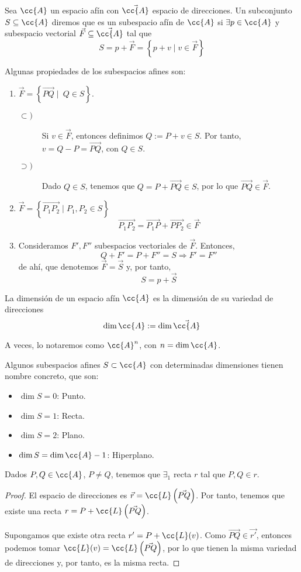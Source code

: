 \begin{definicion}
    Sea $\cc{A}$ un espacio afín con $\vec{\cc{A}}$ espacio de direcciones. Un subconjunto $S\subseteq \cc{A}$ diremos que es un subespacio afín de $\cc{A}$ si $\exists p\in \cc{A}$ y subespacio vectorial $\vec{F}\subseteq \vec{\cc{A}}$ tal que $$S=p+\vec{F}=\left\{p+v\mid v\in \vec{F}\right\}$$
\end{definicion}
Algunas propiedades de los subespacios afines son:
\begin{enumerate}
    \item $\vec{F}=\left\{\vec{PQ}\mid ~Q\in S\right\}$.
    \begin{description}
        \item[$\subset)$] Si $v\in \vec{F}$, entonces definimos $Q:=P+v\in S$. Por tanto, $v=Q-P=\vec{PQ}$, con $Q\in S$.

        \item[$\supset)$] Dado $Q\in S$, tenemos que $Q=P+\vec{PQ}\in S$, por lo que $\vec{PQ}\in \vec{F}$.
    \end{description}
    \item $\vec{F}=\left\{\vec{P_1P_2}\mid P_1,P_2\in S\right\}$
    $$\vec{P_1P_2} = \vec{P_1P} + \vec{PP_2}\in \vec{F}$$
    \item Consideramos $F', F''$ subespacios vectoriales de $\vec{F}$. Entonces,
    $$Q+F' = P+F'' = S \Longrightarrow F'=F''$$
    de ahí, que denotemos $\vec{F}=\vec{S}$ y, por tanto,
    $$S=p+\vec{S}$$
\end{enumerate}


\begin{definicion}
    La dimensión de un espacio afín $\cc{A}$ es la dimensión de su variedad de direcciones
    $$\dim \cc{A} :=\dim \vec{\cc{A}}$$
    
    A veces, lo notaremos como $\cc{A}^n$, con $n=\dim \cc{A}$.
\end{definicion}

Algunos subespacios afines $S\subset \cc{A}$ con determinadas dimensiones tienen nombre concreto, que son:
\begin{itemize}
    \item $\dim S=0$: Punto.
    \item $\dim S=1$: Recta.
    \item $\dim S=2$: Plano.
    \item $\dim S=\dim \cc{A}-1$: Hiperplano.
\end{itemize}

\begin{prop}
    Dados $P,Q\in \cc{A}$, $P\neq Q$, tenemos que $\exists_1$ recta $r$ tal que $P,Q\in r$.
\end{prop}
\begin{proof}
    El espacio de direcciones es $\vec{r}=\cc{L}\left(\vec{PQ}\right)$. Por tanto, tenemos que existe una recta $r=P+\cc{L}\left(\vec{PQ}\right)$.

    Supongamos que existe otra recta $r'=P+\cc{L}(v)$. Como $\vec{PQ}\in \vec{r'}$, entonces podemos tomar $\cc{L}(v)=\cc{L}\left(\vec{PQ}\right)$, por lo que tienen la misma variedad de direcciones y, por tanto, es la misma recta.
\end{proof}


